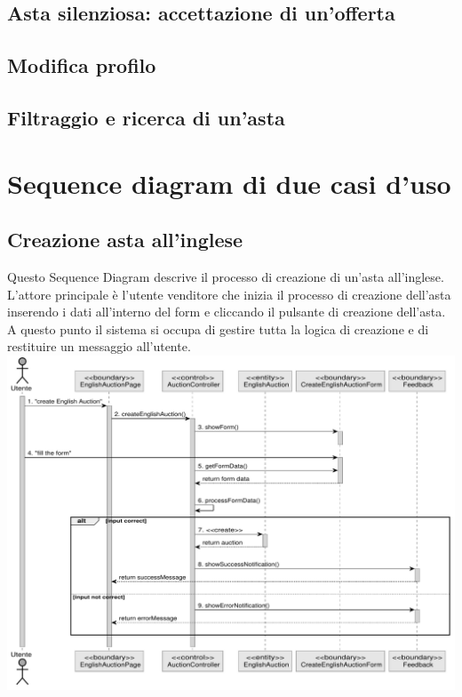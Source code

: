 {	\subsection*{Asta silenziosa: accettazione di un'offerta}
	
	\newpage

	\subsection*{Modifica profilo}
	
	\newpage

	\subsection*{Filtraggio e ricerca di un'asta}
	
} %

\newpage
\section{Sequence diagram di due casi d'uso}
\subsection{Creazione asta all'inglese}
Questo Sequence Diagram descrive il processo di creazione di un'asta all'inglese. \\
L'attore principale è l'utente venditore che inizia il processo di creazione dell'asta inserendo i dati all'interno del form e cliccando il pulsante di creazione dell'asta.\\
A questo punto il sistema si occupa di gestire tutta la logica di creazione e di restituire un messaggio all'utente.\bskip
\includegraphics[width=\textwidth]{assets/sequence/creazione_asta_inglese.pdf}
\newpage

